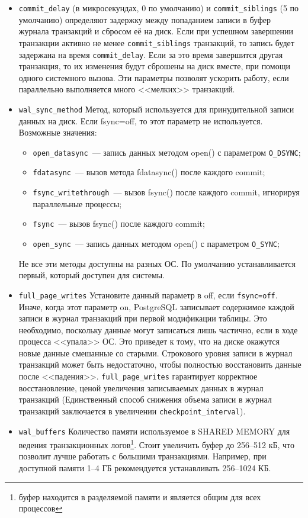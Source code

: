 \begin{itemize}
  \item \lstinline!commit_delay! (в микросекундах, 0 по умолчанию) и \lstinline!commit_siblings! (5 по умолчанию) определяют задержку между попаданием записи в буфер журнала транзакций и сбросом её на диск. Если при успешном завершении транзакции активно не менее \lstinline!commit_siblings! транзакций, то запись будет задержана на время \lstinline!commit_delay!. Если за это время завершится другая транзакция, то их изменения будут сброшены на диск вместе, при помощи одного системного вызова. Эти параметры позволят ускорить работу, если параллельно выполняется много <<мелких>> транзакций.

  \item \lstinline!wal_sync_method! Метод, который используется для принудительной записи данных на диск. Если fsync=off, то этот параметр не используется. Возможные значения:
  \begin{itemize}
    \item \lstinline!open_datasync!~--- запись данных методом open() с параметром \lstinline!O_DSYNC!;
    \item \lstinline!fdatasync!~--- вызов метода fdatasync() после каждого commit;
    \item \lstinline!fsync_writethrough!~--- вызов fsync() после каждого commit, игнорируя параллельные процессы;
    \item \lstinline!fsync!~--- вызов fsync() после каждого commit;
    \item \lstinline!open_sync!~--- запись данных методом open() с параметром \lstinline!O_SYNC!;
  \end{itemize}

  Не все эти методы доступны на разных ОС. По умолчанию устанавливается первый, который доступен для системы.

  \item \lstinline!full_page_writes! Установите данный параметр в off, если \lstinline!fsync=off!. Иначе, когда этот параметр on, PostgreSQL записывает содержимое каждой записи в журнал транзакций при первой модификации таблицы. Это необходимо, поскольку данные могут записаться лишь частично, если в ходе процесса <<упала>> ОС. Это приведет к тому, что на диске окажутся новые данные смешанные со старыми. Строкового уровня записи в журнал транзакций может быть недостаточно, чтобы полностью восстановить данные после <<падения>>. \lstinline!full_page_writes! гарантирует корректное восстановление, ценой увеличения записываемых данных в журнал транзакций (Единственный способ снижения объема записи в журнал транзакций заключается в увеличении \lstinline!checkpoint_interval!).

  \item \lstinline!wal_buffers! Количество памяти используемое в SHARED MEMORY для ведения транзакционных логов\footnote{буфер находится в разделяемой памяти и является общим для всех процессов}. Стоит увеличить буфер до 256--512 кБ, что позволит лучше работать с большими транзакциями. Например, при доступной памяти 1--4 ГБ рекомендуется устанавливать 256--1024 КБ.
\end{itemize}


